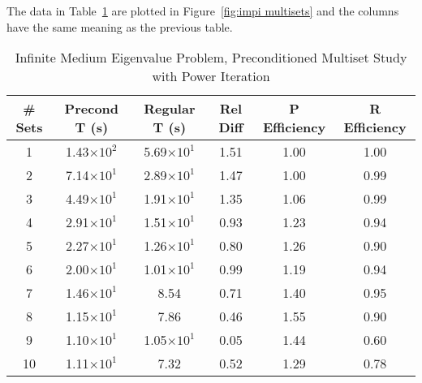 The data in Table~\ref{table:impi multisets} are plotted in Figure~\ref{fig:impi multisets} and the columns have the same meaning as the previous table. 
\begin{table}[!h]
\caption{Infinite Medium Eigenvalue Problem, Preconditioned Multiset Study with Power Iteration}
\begin{center}
\begin{tabular}{|c |c |c |c |c |c|}
\hline
\# Sets & Precond T (s) & Regular T (s) & Rel Diff & P Efficiency & R Efficiency \\[0.5ex]
\hline
1   & 1.43$\times 10^{2}$ & 5.69$\times 10^{1}$ & 1.51 & 1.00 & 1.00 \\
2   & 7.14$\times 10^{1}$ & 2.89$\times 10^{1}$ & 1.47 & 1.00 & 0.99 \\
3   & 4.49$\times 10^{1}$ & 1.91$\times 10^{1}$ & 1.35 & 1.06 & 0.99 \\ 
4   & 2.91$\times 10^{1}$ & 1.51$\times 10^{1}$ & 0.93 & 1.23 & 0.94 \\
5   & 2.27$\times 10^{1}$ & 1.26$\times 10^{1}$ & 0.80 & 1.26 & 0.90 \\
6   & 2.00$\times 10^{1}$ & 1.01$\times 10^{1}$ & 0.99 & 1.19 & 0.94 \\
7   & 1.46$\times 10^{1}$ & 8.54                          & 0.71 & 1.40 & 0.95 \\
8   & 1.15$\times 10^{1}$ & 7.86                          & 0.46 & 1.55 & 0.90 \\
9   & 1.10$\times 10^{1}$ & 1.05$\times 10^{1}$ & 0.05 & 1.44 & 0.60 \\
10 & 1.11$\times 10^{1}$ & 7.32                          & 0.52 & 1.29 & 0.78 \\
\hline 
\end{tabular} 
\end{center}
\label{table:impi multisets}
\end{table}